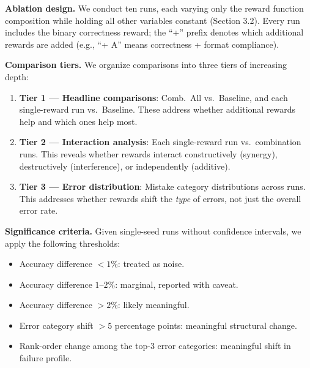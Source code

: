 \textbf{Ablation design.}
We conduct ten runs, each varying only the reward function composition while holding all other variables constant (Section 3.2).
Every run includes the binary correctness reward; the ``+'' prefix denotes which additional rewards are added (e.g., ``+ A'' means correctness + format compliance).



\textbf{Comparison tiers.}
We organize comparisons into three tiers of increasing depth:

\begin{enumerate}[nosep]
    \item \textbf{Tier 1 --- Headline comparisons}: Comb.\ All vs.\ Baseline, and each single-reward run vs.\ Baseline. These address whether additional rewards help and which ones help most.
    \item \textbf{Tier 2 --- Interaction analysis}: Each single-reward run vs.\ combination runs. This reveals whether rewards interact constructively (synergy), destructively (interference), or independently (additive).
    \item \textbf{Tier 3 --- Error distribution}: Mistake category distributions across runs. This addresses whether rewards shift the \emph{type} of errors, not just the overall error rate.
\end{enumerate}

\textbf{Significance criteria.}
Given single-seed runs without confidence intervals, we apply the following thresholds:

\begin{itemize}[nosep]
    \item Accuracy difference $< 1\%$: treated as noise.
    \item Accuracy difference $1$--$2\%$: marginal, reported with caveat.
    \item Accuracy difference $> 2\%$: likely meaningful.
    \item Error category shift $> 5$ percentage points: meaningful structural change.
    \item Rank-order change among the top-3 error categories: meaningful shift in failure profile.
\end{itemize}
